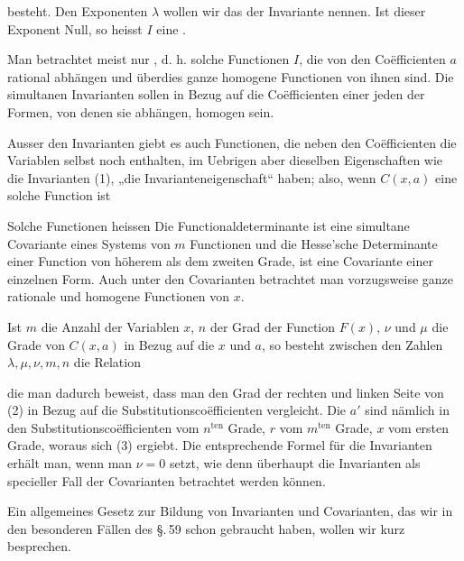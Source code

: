 besteht. Den Exponenten $\lambda$ wollen wir das  der
Invariante nennen. Ist dieser Exponent Null, so heisst $I$ eine
.

Man betrachtet meist nur ,
d. h. solche Functionen $I$, die von den Coëfficienten $a$ rational
abhängen und überdies ganze homogene Functionen von
ihnen sind. Die simultanen Invarianten sollen in Bezug auf die
Coëfficienten einer jeden der Formen, von denen sie abhängen,
homogen sein.

Ausser den Invarianten giebt es auch Functionen, die neben
den Coëfficienten die Variablen selbst noch enthalten, im Uebrigen
aber dieselben Eigenschaften wie die Invarianten (1), „die Invarianteneigenschaft“ haben; also, wenn $C(x, a)$ eine solche
Function ist


Solche Functionen heissen 
Die Functionaldeterminante ist eine simultane Covariante eines
Systems von $m$ Functionen und die Hesse'sche Determinante
einer Function von höherem als dem zweiten Grade, ist eine
Covariante einer einzelnen Form. Auch unter den Covarianten
betrachtet man vorzugsweise ganze rationale und homogene
Functionen von $x$.

Ist $m$ die Anzahl der Variablen $x$, $n$ der Grad der Function
$F(x)$, $\nu$ und $\mu$ die Grade von $C(x, a)$ in Bezug auf die $x$ und
$a$, so besteht zwischen den Zahlen $\lambda, \mu, \nu, m, n$ die Relation


die man dadurch beweist, dass man den Grad der rechten und
linken Seite von (2) in Bezug auf die Substitutionscoëfficienten
vergleicht. Die $a'$ sind nämlich in den Substitutionscoëfficienten
vom $n^{\text{ten}}$ Grade, $r$ vom $m^{\text{ten}}$ Grade, $x$ vom ersten Grade, woraus
sich (3) ergiebt. Die entsprechende Formel für die Invarianten
erhält man, wenn man $\nu = 0$ setzt, wie denn überhaupt die
Invarianten als specieller Fall der Covarianten betrachtet werden
können.

Ein allgemeines Gesetz zur Bildung von Invarianten und
Covarianten, das wir in den besonderen Fällen des \S.\,59 schon
gebraucht haben, wollen wir kurz besprechen.
